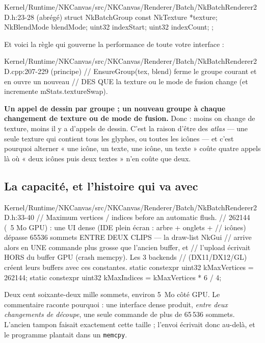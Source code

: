 \begin{nkcode}{Kernel/Runtime/NKCanvas/src/NKCanvas/Renderer/Batch/NkBatchRenderer2D.h:23-28 (abrégé)}
struct NkBatchGroup {
    const NkTexture *texture;
    NkBlendMode blendMode;
    uint32 indexStart;
    uint32 indexCount;
};
\end{nkcode}

Et voici la règle qui gouverne la performance de toute votre interface :

\begin{nkcode}{Kernel/Runtime/NKCanvas/src/NKCanvas/Renderer/Batch/NkBatchRenderer2D.cpp:207-229 (principe)}
// EnsureGroup(tex, blend) ferme le groupe courant et en ouvre un nouveau
// DES QUE la texture ou le mode de fusion change (et incremente mStats.textureSwap).
\end{nkcode}

\begin{nkretenir}[La règle d'or du 2D]
\textbf{Un appel de dessin par groupe ; un nouveau groupe à chaque changement de
texture ou de mode de fusion.} Donc : moins on change de texture, moins il y a
d'appels de dessin. C'est la raison d'être des \emph{atlas} — une seule texture
qui contient tous les glyphes, ou toutes les icônes — et c'est pourquoi
alterner « une icône, un texte, une icône, un texte » coûte quatre appels là où
« deux icônes puis deux textes » n'en coûte que deux.
\end{nkretenir}

\subsection{La capacité, et l'histoire qui va avec}

\begin{nkcode}{Kernel/Runtime/NKCanvas/src/NKCanvas/Renderer/Batch/NkBatchRenderer2D.h:33-40}
// Maximum vertices / indices before an automatic flush.
// 262144 (~5 Mo GPU) : une UI dense (IDE plein écran : arbre + onglets +
// icônes) dépasse 65536 sommets ENTRE DEUX CLIPS — la draw-list NkGui
// arrive alors en UNE commande plus grosse que l'ancien buffer, et
// l'upload écrivait HORS du buffer GPU (crash memcpy). Les 3 backends
// (DX11/DX12/GL) créent leurs buffers avec ces constantes.
static constexpr uint32 kMaxVertices = 262144;
static constexpr uint32 kMaxIndices  = kMaxVertices * 6 / 4;
\end{nkcode}

Deux cent soixante-deux mille sommets, environ 5~Mo côté GPU. Le commentaire
raconte pourquoi : une interface dense produit, \emph{entre deux changements de
découpe}, une seule commande de plus de 65\,536 sommets. L'ancien tampon faisait
exactement cette taille ; l'envoi écrivait donc au-delà, et le programme
plantait dans un \texttt{memcpy}.

